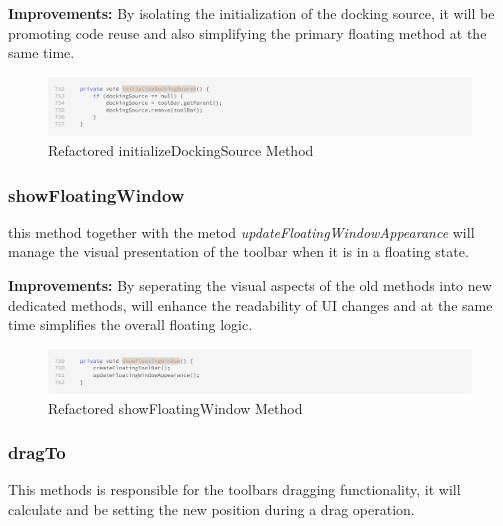 \textbf{Improvements:} By isolating the initialization of the docking source, it will be promoting code reuse and also simplifying the primary floating method at the same time.

\begin{figure}[H]
    \centering
    \includegraphics[width=\linewidth]{pic/F initializeDockingSource.png}
    \caption{Refactored initializeDockingSource Method}
    \label{fig:Refactored initializeDockingSource Method}
\end{figure}









\subsubsection{showFloatingWindow}
this method together with the metod \textit{updateFloatingWindowAppearance} will manage the visual presentation of the toolbar when it is in a floating state.

\textbf{Improvements:} By seperating the visual aspects of the old methods into new dedicated methods, will enhance the readability of UI changes and at the same time
simplifies the overall floating logic.

\begin{figure}[H]
    \centering
    \includegraphics[width=\linewidth]{pic/F showFloatingWindow.png}
    \caption{Refactored showFloatingWindow Method}
    \label{fig:Refactored showFloatingWindow Method}
\end{figure}







\subsubsection{dragTo}
This methods is responsible for the toolbars dragging functionality, it will calculate and be setting the new position during a drag operation.

